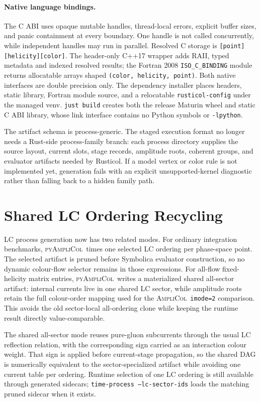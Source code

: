 \documentclass[10pt]{article}
\newcommand{\AC}{\textsc{AmpliCol}}
\newcommand{\PAC}{\textsc{pyAmpliCol}}
\begin{document}
\paragraph{Native language bindings.}
The C ABI uses opaque mutable handles, thread-local errors, explicit buffer
sizes, and panic containment at every boundary.  One handle is not called
concurrently, while independent handles may run in parallel.  Resolved C
storage is \texttt{[point][helicity][color]}.  The header-only C++17 wrapper
adds RAII, typed metadata and indexed resolved results; the Fortran 2008
\texttt{ISO\_C\_BINDING} module returns allocatable arrays shaped
\texttt{(color, helicity, point)}.  Both native interfaces are double precision
only.  The dependency installer places headers, static library, Fortran module
source, and a relocatable \texttt{rusticol-config} under the managed venv.
\texttt{just build} creates both the release Maturin wheel and static C ABI
library, whose link interface contains no Python symbols or \texttt{-lpython}.

The artifact schema is process-generic.  The staged execution format no longer
needs a Rust-side process-family branch: each process directory supplies the
source layout, current slots, stage records, amplitude roots, coherent groups,
and evaluator artifacts needed by Rusticol.  If a model vertex or color rule is
not implemented yet, generation fails with an explicit unsupported-kernel
diagnostic rather than falling back to a hidden family path.

\section{Shared LC Ordering Recycling}

LC process generation now has two related modes.  For ordinary integration
benchmarks, \PAC\ times one selected LC ordering per phase-space point.  The
selected artifact is pruned before Symbolica evaluator construction, so no
dynamic colour-flow selector remains in those expressions.  For all-flow
fixed-helicity matrix entries, \PAC\ writes a materialized shared all-sector
artifact: internal currents live in one shared LC sector, while amplitude roots
retain the full colour-order mapping used for the \AC\ \texttt{imode=2}
comparison.  This avoids the old sector-local all-ordering clone while keeping
the runtime result directly value-comparable.

The shared all-sector mode reuses pure-gluon subcurrents through the usual LC
reflection relation, with the corresponding sign carried as an interaction
colour weight.  That sign is applied before current-stage propagation, so the
shared DAG is numerically equivalent to the sector-specialized artifact while
avoiding one current table per ordering.  Runtime selection of one LC ordering
is still available through generated sidecars; \texttt{time-process
--lc-sector-ids} loads the matching pruned sidecar when it exists.
\end{document}

